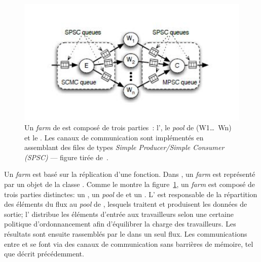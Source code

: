 \begin{figure}[ht]
\centering


     \includegraphics[width=1.0\textwidth]{Figures/FastFlowFarm.jpg}
      \caption[Les trois parties d'un \emph{farm} de .]{Un \emph{farm} de  est compos\'e de trois parties~:  l', le \emph{pool} de  (W1\ldots\ Wn) et le . Les canaux de communication sont impl\'ement\'es en assemblant des files de types \emph{Simple Producer/Simple Consumer (SPSC)} --- figure tir\'ee de~\citep{aldinucci2010efficient}.}
       \label{FastFlowFarm.fig}
\end{figure}

Un \emph{farm} est bas\'e sur la r\'eplication d'une fonction. Dans , un \emph{farm} est repr\'esent\'e par un objet de la classe . Comme le montre la figure~\ref{FastFlowFarm.fig}, un \emph{farm} est compos\'e de trois parties distinctes: un , un  \emph{pool} de  et un . L' est responsable de la r\'epartition des \'el\'ements du flux au \emph{pool} de , lesquels traitent et produisent les donn\'ees de sortie; l' distribue les \'el\'ements d'entr\'ee aux travailleurs selon une certaine politique d'ordonnancement afin d'\'equilibrer la charge des travailleurs. Les r\'esultats sont ensuite rassembl\'es par le  dans un seul flux. Les communications entre  et  se font via des canaux de communication sans barri\`eres de m\'emoire, tel que d\'ecrit pr\'ec\'edemment.


